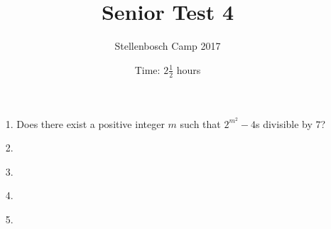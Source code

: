 \documentclass[12pt]{article}
\title{Senior Test 4}
\author{Stellenbosch Camp 2017}
\date{Time: $2\frac{1}{2}$ hours}
\begin{document}
 \maketitle

\begin{enumerate}

\item[1.] %
Does there exist a positive integer $m$ such that $2^{m^2} - 4$s divisible by $7$?


\item[2.] %


\item[3.] %


\item[4.] %
 

\item[5.] %


\end{enumerate}
\end{document}
